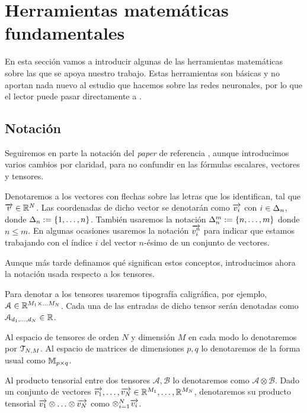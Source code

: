 
\chapter{Herramientas matemáticas fundamentales} \label{ch:matematicas_fundamentales}

En esta sección vamos a introducir algunas de las herramientas matemáticas sobre las que se apoya nuestro trabajo. Estas herramientas son básicas y no aportan nada nuevo al estudio que hacemos sobre las redes neuronales, por lo que el lector puede pasar directamente a .

\section{Notación}

Seguiremos en parte la notación del \textit{paper} de referencia \cite{matematicas:principal}, aunque introducimos varios cambios por claridad, para no confundir en las fórmulas escalares, vectores y tensores.

Denotaremos a los vectores con flechas sobre las letras que los identifican, tal que $\overrightarrow{v} \in \mathbb{R}^N$. Las coordenadas de dicho vector se denotarán como $\overrightarrow{v_i}$ con $i \in \Delta_{n}$, donde $\Delta_{n} := \{1, \ldots, n\}$. También usaremos la notación $\Delta_{n}^{m} := \{n, \ldots, m\}$ donde $n \leq m$. En algunas ocasiones usaremos la notación $\overrightarrow{v_i^n}$ para indicar que estamos trabajando con el índice $i$ del vector $n$-ésimo de un conjunto de vectores.

Aunque más tarde definamos qué significan estos conceptos, introducimos ahora la notación usada respecto a los tensores.

Para denotar a los tensores usaremos tipografía caligráfica, por ejemplo, $\mathcal{A} \in \mathbb{R}^{M_1 \times \ldots M_N}$. Cada una de las entradas de dicho tensor serán denotadas como $\mathcal{A}_{d_1, \ldots, d_N} \in \mathbb{R}$.

Al espacio de tensores de orden $N$ y dimensión $M$ en cada modo lo denotaremos por $\mathcal{T}_{N, M}$. Al espacio de matrices de dimensiones $p, q$ lo denotaremos de la forma usual como  $\mathbb{M}_{p \times q}$.

Al producto tensorial entre dos tensores $\mathcal{A}, \mathcal{B}$ lo denotaremos como $\mathcal{A} \otimes \mathcal{B}$. Dado un conjunto de vectores $\overrightarrow{v_1}, \ldots, \overrightarrow{v_N} \in \mathbb{R}^{M_1}, \ldots, \mathbb{R}^{M_N}$, denotaremos su producto tensorial $\overrightarrow{v_1} \otimes \ldots \otimes \overrightarrow{v_N}$ como $\otimes_{i = 1}^N \overrightarrow{v_i}$.

